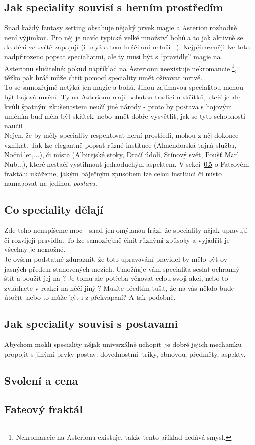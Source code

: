 \subsection{Jak speciality souvisí s herním prostředím}
\label{sec:spec-prvky}

Snad každý fantasy setting obsahuje nějaký prvek magie a Asterion rozhodně není výjimkou. Pro něj je navíc typické velké množství bohů a to jak aktivně se do dění ve světě zapojují (i když o tom hráči ani netuší...). Nejpřirozeněji lze toto nadpřirozeno popsat specialiatmi, ale ty musí být s ``pravidly'' magie na Asterionu slučitelné: pokud například na Asterionu neexistuje nekromancie \footnote{Nekromancie na Asterionu existuje, takže tento příklad nedává smysl.}, těžko pak hráč může chtít pomocí speciality umět oživovat mrtvé.\\
To se samozřejmě netýká jen magie a bohů. Jinou zajímavou specialitou mohou být bojová umění. Ty na Asterionu mají bohatou tradici u skřítků, kteří je ale kvůli špatným zkušenostem neučí jiné národy - proto by postava s bojovým uměním buď měla být skřítek, nebo umět dobře vysvětlit, jak se tyto schopnosti naučil.\\
Nejen, že by měly speciality respektovat herní prostředí, mohou z něj dokonce vznikat. Tak lze elegantně popsat různé instituce (Almendorská tajná služba, Noční let,...), či místa (Albirejské stoky, Dračí údolí, Stínový svět, Poušť Mar' Nub...), které nestačí vystihnout jednoduchým aspektem. V sekci~\ref{sec:spec-fraktal} o Fateovém fraktálu ukážeme, jakým báječným způsobem lze celou instituci či místo namapovat na jedinou \textit{postavu}.

\subsection{Co speciality dělají}
\label{sec:spec-delaji}
Zde toho nenapíšeme moc - snad jen omýlanou frázi, že speciality nějak upravují či rozvíjejí pravidla. To lze samozřejmě činit různými způsoby a vyjádřit je všechny je nemožné. \\
Je ovšem podstatné zdůraznit, že toto upravování pravidel by mělo být ov jasných předem stanovených mezích. Umožňuje vám specialita seslat ochranný štít a použít jej na ? Je tomu ale potřeba věnovat celou svoji akci, nebo to zvládnete v reakci na něčí jiný ? Musíte předtím tušit, že na vás někdo bude útočit, nebo to může být i z překvapení? A tak podobně.

\subsection{Jak speciality souvisí s postavami}
\label{sec:spec-postavy}
Abychom mohli speciality nějak univerzálně uchopit, je dobré jejich mechaniku propojit s jinými prvky postav: dovednostmi, triky, obnovou, předměty, aspekty.



\subsection{Svolení a cena}
\label{sec:spec-svolenicena}


\subsection{Fateový fraktál}
\label{sec:spec-fraktal}




